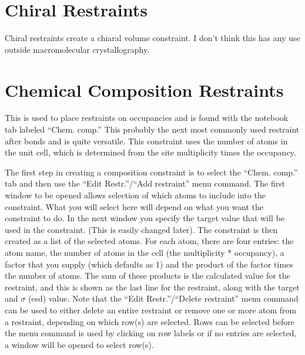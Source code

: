 \section{Chiral Restraints}
Chiral restraints create a chiaral volume constraint. I don't think this has any use outside macromolecular crystallography. 

\section{Chemical Composition Restraints}
This is used to place restraints on occupancies and is found with the notebook tab labeled ``Chem. comp.'' This probably the next most commonly used restraint after bonds and is quite versatile. This constraint uses the number of atoms in the unit cell, which is determined from the site multiplicity times the occupancy. 

The first step in creating a composition constraint is to select the ``Chem. comp.''  tab and then use the  ``Edit Restr.''/``Add restraint'' menu command. The first window to be opened allows selection of which atoms to include into the constraint. What you will select here will depend on what you want the constraint to do. In the next window you specify the target value that will be used in the constraint. (This is easily changed later). The constraint is then created as a list of the selected atoms. For each atom, there are four entries: the atom name, the number of atoms in the cell (the multiplicity * occupancy), a factor that you supply (which defaults as 1) and the product of the factor times the number of atoms. The sum of these products is the calculated value for the restraint, and this is shown as the last line for the restraint, along with the target and $\sigma$ (esd) value. Note that the ``Edit Restr.''/``Delete restraint'' menu command can be used to either delete an entire restraint or remove one or more atom from a restraint, depending on which row(s) are selected. Rows can be selected before the menu command is used by clicking on row labels or if no entries are selected, a window will be opened to select row(s). 

